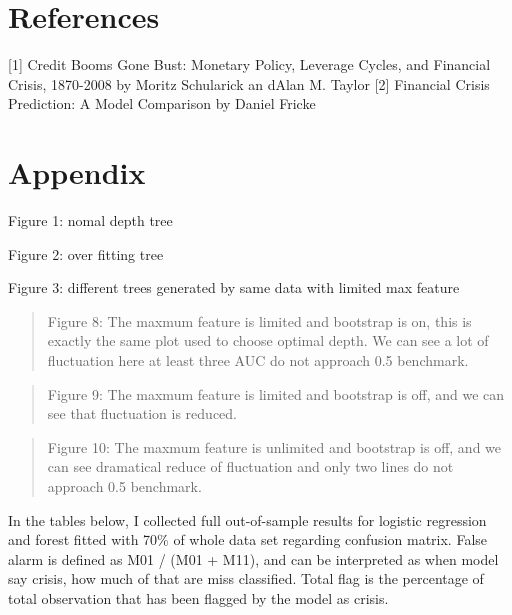 \documentclass{article}
\newcommand{\ciapdf}[1]{\vspace*{-\parskip}\resizebox{0.9\textwidth}{!}{\texttt{[image: \#1]}}}
\begin{document}
\section*{References}

{[}1{]} Credit Booms Gone Bust: Monetary Policy, Leverage Cycles, and
Financial Crisis, 1870-2008 by Moritz Schularick an dAlan M. Taylor
{[}2{]} Financial Crisis Prediction: A Model Comparison by Daniel Fricke

\section*{Appendix}

Figure 1: nomal depth tree

\ciapdf{app_normaldepth.pdf}

Figure 2: over fitting tree 

\ciapdf{app_overfitting.pdf}

Figure 3:
different trees generated by same data with limited max feature

\ciapdf{app_samedata_1.pdf}

\ciapdf{app_samedata_2.pdf}

\ciapdf{Figure_8.pdf}
\begin{quote}
Figure 8: The maxmum feature is limited and bootstrap is on, this is
exactly the same plot used to choose optimal depth. We can see a lot of
fluctuation here at least three AUC do not approach 0.5 benchmark.
\end{quote}

\ciapdf{Figure_9.pdf}
\begin{quote}
Figure 9: The maxmum feature is limited and bootstrap is off, and we can
see that fluctuation is reduced.
\end{quote}

\ciapdf{Figure_10.pdf}
\begin{quote}
Figure 10: The maxmum feature is unlimited and bootstrap is off, and we
can see dramatical reduce of fluctuation and only two lines do not
approach 0.5 benchmark.
\end{quote}

In the tables below, I collected full out-of-sample results for logistic
regression and forest fitted with 70\% of whole data set regarding confusion matrix. False alarm is defined as
M01 / (M01 + M11), and can be interpreted as when model say crisis, how much of that are
miss classified. Total flag is the percentage of total observation that has been flagged by the model as crisis.
\end{document}
